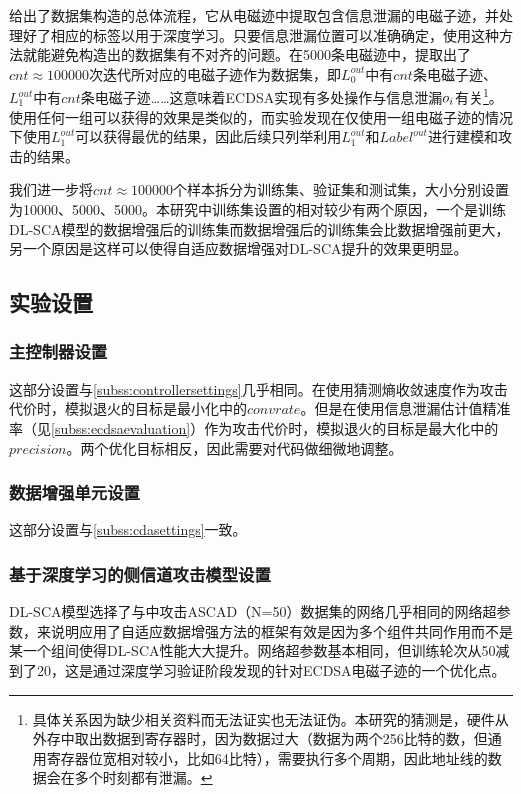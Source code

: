 {	给出了数据集构造的总体流程，它从电磁迹中提取包含信息泄漏的电磁子迹，并处理好了相应的标签以用于深度学习。只要信息泄漏位置可以准确确定，使用这种方法就能避免构造出的数据集有不对齐的问题。在5000条电磁迹中，提取出了$cnt\approx100000$次迭代所对应的电磁子迹作为数据集，即$L_0^{out}$中有$cnt$条电磁子迹、$L_1^{out}$中有$cnt$条电磁子迹……这意味着ECDSA实现有多处操作与信息泄漏$o_i$有关\footnote{具体关系因为缺少相关资料而无法证实也无法证伪。本研究的猜测是，硬件从外存中取出数据到寄存器时，因为数据过大（数据为两个256比特的数，但通用寄存器位宽相对较小，比如64比特），需要执行多个周期，因此地址线的数据会在多个时刻都有泄漏。}。使用任何一组可以获得的效果是类似的，而实验发现在仅使用一组电磁子迹的情况下使用$L_1^{out}$可以获得最优的结果，因此后续只列举利用$L_1^{out}$和$Label^{out}$进行建模和攻击的结果。
	
	我们进一步将$cnt\approx100000$个样本拆分为训练集、验证集和测试集，大小分别设置为10000、5000、5000。本研究中训练集设置的相对较少有两个原因，一个是训练DL-SCA模型的数据增强后的训练集而数据增强后的训练集会比数据增强前更大，另一个原因是这样可以使得自适应数据增强对DL-SCA提升的效果更明显。
	\subsection{实验设置}
	\subsubsection{主控制器设置}
	这部分设置与\ref{subss:controllersettings}几乎相同。在使用猜测熵收敛速度作为攻击代价时，模拟退火的目标是最小化中的$convrate$。但是在使用信息泄漏估计值精准率（见\ref{subss:ecdsaevaluation}）作为攻击代价时，模拟退火的目标是最大化中的$precision$。两个优化目标相反，因此需要对代码做细微地调整。
	\subsubsection{数据增强单元设置}
	这部分设置与\ref{subss:cdasettings}一致。
	\subsubsection{基于深度学习的侧信道攻击模型设置}
	DL-SCA模型选择了与中攻击ASCAD（N=50）数据集的网络几乎相同的网络超参数，来说明应用了自适应数据增强方法的框架有效是因为多个组件共同作用而不是某一个组间使得DL-SCA性能大大提升。网络超参数基本相同，但训练轮次从50减到了20，这是通过深度学习验证阶段发现的针对ECDSA电磁子迹的一个优化点。
}
